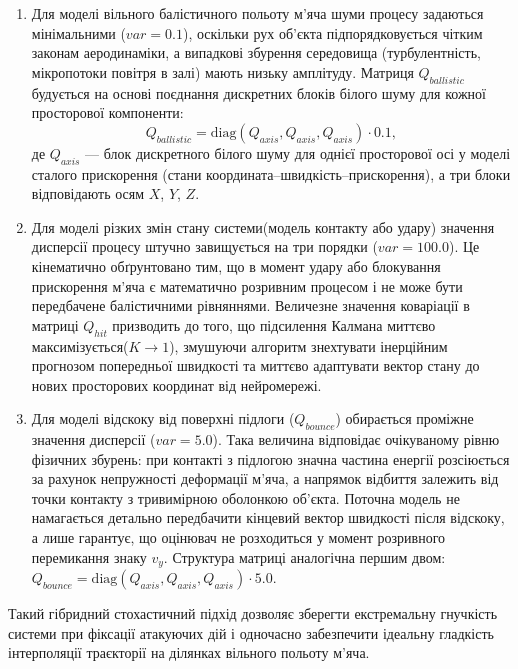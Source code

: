 \begin{enumerate}
    \item Для моделі вільного балістичного польоту м'яча шуми процесу задаються мінімальними ($var = 0.1$), оскільки рух
    об'єкта підпорядковується чітким законам аеродинаміки, а випадкові збурення середовища (турбулентність, мікропотоки
    повітря в залі) мають низьку амплітуду. Матриця $Q_{ballistic}$ будується на основі поєднання дискретних блоків
    білого шуму для кожної просторової компоненти:
    \begin{equation}Q_{ballistic} = \text{diag}(Q_{axis}, Q_{axis}, Q_{axis}) \cdot 0.1,\end{equation}
    де $Q_{axis}$ --- блок дискретного білого шуму для однієї просторової осі у моделі сталого прискорення (стани
    координата--швидкість--прискорення), а три блоки відповідають осям $X$, $Y$, $Z$.
    \item Для моделі різких змін стану системи(модель контакту або удару) значення дисперсії процесу штучно завищується на
    три порядки ($var = 100.0$). Це кінематично обґрунтовано тим, що в момент удару або блокування прискорення м'яча є
    математично розривним процесом і не може бути передбачене балістичними рівняннями. Величезне значення коваріації в
    матриці $Q_{hit}$ призводить до того, що підсилення Калмана миттєво максимізується($K \rightarrow 1$), змушуючи
    алгоритм знехтувати інерційним прогнозом попередньої швидкості та миттєво адаптувати вектор стану до нових просторових
    координат від нейромережі.
    \item Для моделі відскоку від поверхні підлоги ($Q_{bounce}$) обирається проміжне значення дисперсії
    ($var = 5.0$). Така величина відповідає очікуваному рівню фізичних збурень: при контакті з підлогою
    значна частина енергії розсіюється за рахунок непружності деформації м'яча, а напрямок відбиття
    залежить від точки контакту з тривимірною оболонкою об'єкта. Поточна модель не намагається
    детально передбачити кінцевий вектор швидкості після відскоку, а лише гарантує, що оцінювач не
    розходиться у момент розривного перемикання знаку $v_y$. Структура матриці аналогічна першим
    двом: $Q_{bounce} = \text{diag}(Q_{axis}, Q_{axis}, Q_{axis}) \cdot 5.0$.
\end{enumerate}

Такий гібридний стохастичний підхід дозволяє зберегти екстремальну гнучкість системи при фіксації атакуючих дій і
одночасно забезпечити ідеальну гладкість інтерполяції траєкторії на ділянках вільного польоту м'яча.

